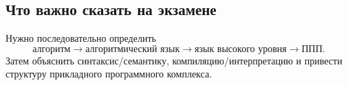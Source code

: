 \subsection{Что важно сказать на экзамене}

Нужно последовательно определить
\[
\boxed{\text{алгоритм}\rightarrow\text{алгоритмический язык}\rightarrow\text{язык высокого уровня}\rightarrow\text{ППП}}.
\]
Затем объяснить синтаксис/семантику, компиляцию/интерпретацию и привести структуру прикладного программного комплекса.

\newpage
